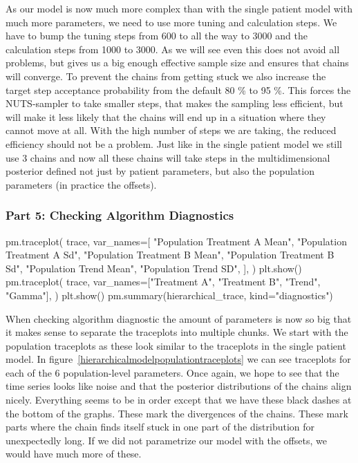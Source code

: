 \documentclass[12pt,a4paper,leqno]{report}
\theoremstyle{plain}
\theoremstyle{definition}
\theoremstyle{remark}
\begin{document}
As our model is now much more complex than with the single patient model with much
more parameters, we need to use more tuning and calculation steps. We have to bump the tuning steps from 600 to all the way to
3000 and the calculation steps from 1000 to 3000. As we will see even this does not
avoid all problems, but gives us a big enough effective sample size and ensures that
chains will converge. To prevent the chains from getting stuck we also increase the target
step acceptance probability  from the default 80 \% to 95 \%.
This forces the NUTS-sampler to take smaller steps, that makes the sampling less
efficient, but will make it less likely that the chains will end up in a situation where
they cannot move at all. With the high number of steps we are taking, the reduced
efficiency should not be a problem. Just like in the single patient model we still use 3
chains and now all these chains will take steps in the multidimensional posterior defined not
just by patient parameters, but also the population parameters (in practice the offsets).

\subsubsection*{Part 5: Checking Algorithm Diagnostics}

\bigskip
\begin{pyverbatim}[][fontsize=\footnotesize]
    pm.traceplot(
        trace,
        var_names=[
            "Population Treatment A Mean",
            "Population Treatment A Sd",
            "Population Treatment B Mean",
            "Population Treatment B Sd",
            "Population Trend Mean",
            "Population Trend SD",
        ],
    )
    plt.show()
    pm.traceplot(
        trace,
        var_names=["Treatment A", "Treatment B", "Trend", "Gamma"],
    )
    plt.show()
    pm.summary(hierarchical_trace, kind="diagnostics")
\end{pyverbatim}
\bigskip

When checking algorithm diagnostic the amount of parameters is now so big that it makes
sense to separate the traceplots into multiple chunks. We start with the population
traceplots as these look similar to the traceplots in the single patient
model. In figure\ \ref{hierarchicalmodelpopulationtraceplots} we can see traceplots for each of
the 6 population-level parameters. Once again, we hope to see that the time series looks
like noise and that the posterior distributions of the chains align nicely. Everything
seems to be in order except that we have these black dashes at the bottom of the graphs.
These mark the divergences of the chains. These mark parts where the chain finds itself
stuck in one part of the distribution for unexpectedly long. If we did not
parametrize our model with the offsets, we would have much more of these.
\end{document}
